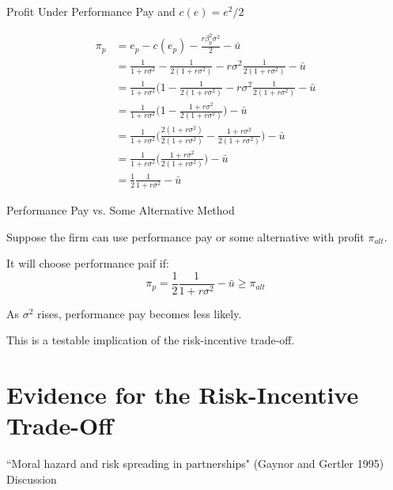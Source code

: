 \documentclass[aspectratio=169,usenames,dvipsnames]{beamer}
\newenvironment{wideitemize}{\itemize\addtolength{\itemsep}{10pt}}{\enditemize}
\begin{document}
\begin{frame}{Profit Under Performance Pay and $c(e)=e^2/2$}

    \begin{align*}
        \pi_p &= e_p-c(e_p)-\frac{r\beta^2_p \sigma^2}{2}-\bar u\\
        &= \frac{1}{1+r \sigma^2} - \frac{1}{2(1+r \sigma^2)} - r\sigma^2\frac{1}{2(1+r \sigma^2)} -\bar u\\
        &= \frac{1}{1+r \sigma^2} \bigg ( 1- \frac{1}{2(1+r \sigma^2)}-r\sigma^2\frac{1}{2(1+r \sigma^2)}-\bar u\\
        &= \frac{1}{1+r \sigma^2} \bigg ( 1- \frac{1+r\sigma^2}{2(1+r \sigma^2)} \bigg )-\bar u\\
        &=\frac{1}{1+r \sigma^2} \bigg ( \frac{2(1+r \sigma^2)}{2(1+r \sigma^2)}- \frac{1+r\sigma^2}{2(1+r \sigma^2)} \bigg )-\bar u\\
        &=\frac{1}{1+r \sigma^2} \bigg (  \frac{1+r\sigma^2}{2(1+r \sigma^2)} \bigg )-\bar u\\
        &=\frac{1}{2}\frac{1}{1+r \sigma^2}-\bar u
    \end{align*}
    
    
\end{frame}


\begin{frame}{Performance Pay vs. Some Alternative Method}

\begin{wideitemize}
    \item Suppose the firm can use performance pay or some alternative with profit $\pi_{alt}$.
    \item It will choose performance paif if:
    \[\pi_p = \frac{1}{2}\frac{1}{1+r \sigma^2}-\bar u \geq \pi_{alt}\]
    \item As $\sigma^2$ rises, performance pay becomes less likely.
    \item This is a testable implication of the risk-incentive trade-off.
\end{wideitemize}
\end{frame}



\section{Evidence for the Risk-Incentive Trade-Off}

\begin{frame}{``Moral hazard and risk spreading in partnerships" (Gaynor and Gertler 1995)}
    \huge Discussion
\end{frame}
\end{document}
